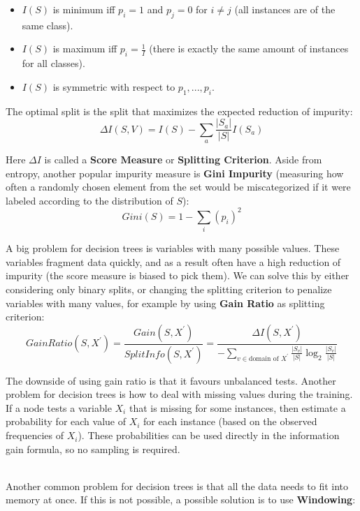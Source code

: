 \documentclass[12pt]{article}
\begin{document}
\begin{itemize}
    \item $I(S)$ is minimum iff $p_i = 1$ and $p_j = 0$ for $i \neq j$ (all instances are of the same class).
    \item $I(S)$ is maximum iff $p_i = \frac{1}{I}$ (there is exactly the same amount of instances for all classes).
    \item $I(S)$ is symmetric with respect to $p_1, ... , p_i$.
\end{itemize}

\noindent
The optimal split is the split that maximizes the expected reduction of impurity:
\[ \Delta I(S, V) = I(S) - \sum_a \frac{|S_a|}{|S|} I(S_a) \]

\noindent
Here $\Delta I$ is called a \textbf{Score Measure} or \textbf{Splitting Criterion}.
Aside from entropy, another popular impurity measure is \textbf{Gini Impurity} (measuring how often a randomly chosen element from the set would be miscategorized if it were labeled according to the distribution of $S$):
\[ Gini(S) = 1 - \sum_i \left( p_i \right)^2 \]

\noindent
A big problem for decision trees is variables with many possible values.
These variables fragment data quickly, and as a result often have a high reduction of impurity (the score measure is biased to pick them).
We can solve this by either considering only binary splits, or changing the splitting criterion to penalize variables with many values, for example by using \textbf{Gain Ratio} as splitting criterion:
\[ GainRatio(S, X^\prime) = \frac{Gain(S, X^\prime)}{SplitInfo(S, X^\prime)} = \frac{\Delta I(S, X^\prime)}{- \displaystyle\sum_{v \in \text{domain of } X^\prime} \frac{|S_v|}{|S|} \log_2 \frac{|S_v|}{|S|}} \]

\noindent
The downside of using gain ratio is that it favours unbalanced tests.
Another problem for decision trees is how to deal with missing values during the training.
If a node tests a variable $X_i$ that is missing for some instances, then estimate a probability for each value of $X_i$ for each instance (based on the observed frequencies of $X_i$). These probabilities can be used directly in the information gain formula, so no sampling is required.

\noindent
\\
Another common problem for decision trees is that all the data needs to fit into memory at once.
If this is not possible, a possible solution is to use \textbf{Windowing}:
\end{document}
